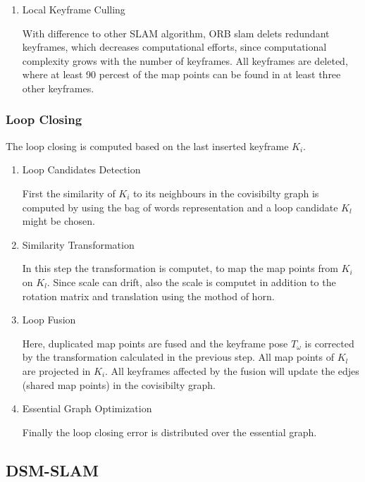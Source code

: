 \begin{enumerate}
	\item{Local Keyframe Culling}
	
	With difference to other SLAM algorithm, ORB slam delets redundant 
	keyframes, which decreases computational efforts, since computational
	complexity grows with the number of keyframes. All keyframes are deleted, 
	where at least 90 percest of the map points can be found in at least three other 
	keyframes. 
	
	
	\end{enumerate}
	
	\subsubsection{Loop Closing}
	
	The loop closing is computed based on the last inserted keyframe $K_i$. 
	
	\begin{enumerate}
	\item{Loop Candidates Detection}
	
	First the similarity of $K_i$ to its neighbours in the covisibilty
	graph is computed by using the bag of words representation and a 
	loop candidate $K_l$ might be chosen. 
	
	\item{Similarity Transformation}
	
	In this step the transformation is computet, to map the map points
	from $K_i$ on $K_l$. Since scale can drift, also the scale is computet
	in addition to the rotation matrix and translation using the mothod of horn. 
	
	
	\item{Loop Fusion}
	
	Here, duplicated map points are fused and the keyframe pose $T_\omega$ is corrected by the transformation
	calculated in the previous step. All map points of $K_l$ are projected in $K_i$. 
	All keyframes affected by the fusion will update the edjes (shared map points) in the 
	covisibilty graph. 
	
	\item{ Essential Graph Optimization}
	
	Finally the loop closing error is distributed over the essential graph. 
	
	
	\end{enumerate}
	

	\subsection{DSM-SLAM}

